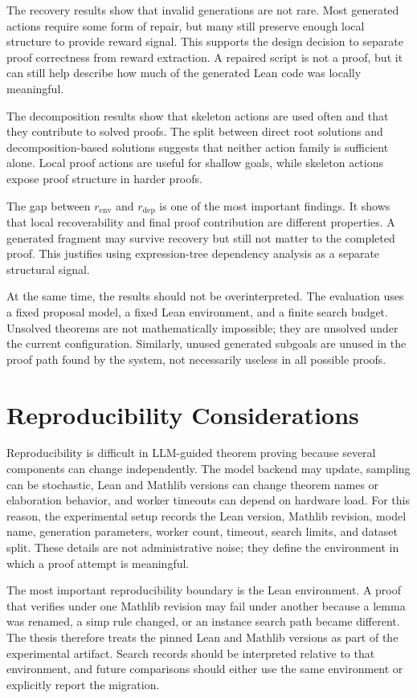\documentclass[en]{uet_awesome_thesis/uet-awesome-thesis}
\begin{document}
The recovery results show that invalid generations are not rare. Most generated actions require some form of repair, but many still preserve enough local structure to provide reward signal. This supports the design decision to separate proof correctness from reward extraction. A repaired script is not a proof, but it can still help describe how much of the generated Lean code was locally meaningful.

The decomposition results show that skeleton actions are used often and that they contribute to solved proofs. The split between direct root solutions and decomposition-based solutions suggests that neither action family is sufficient alone. Local proof actions are useful for shallow goals, while skeleton actions expose proof structure in harder proofs.

The gap between \(r_{\mathrm{env}}\) and \(r_{\mathrm{dep}}\) is one of the most important findings. It shows that local recoverability and final proof contribution are different properties. A generated fragment may survive recovery but still not matter to the completed proof. This justifies using expression-tree dependency analysis as a separate structural signal.

At the same time, the results should not be overinterpreted. The evaluation uses a fixed proposal model, a fixed Lean environment, and a finite search budget. Unsolved theorems are not mathematically impossible; they are unsolved under the current configuration. Similarly, unused generated subgoals are unused in the proof path found by the system, not necessarily useless in all possible proofs.


\section{Reproducibility Considerations}

Reproducibility is difficult in LLM-guided theorem proving because several components can change
independently. The model backend may update, sampling can be stochastic, Lean and Mathlib versions
can change theorem names or elaboration behavior, and worker timeouts can depend on hardware load.
For this reason, the experimental setup records the Lean version, Mathlib revision, model name, generation
parameters, worker count, timeout, search limits, and dataset split. These details are not administrative
noise; they define the environment in which a proof attempt is meaningful.

The most important reproducibility boundary is the Lean environment. A proof that verifies under one
Mathlib revision may fail under another because a lemma was renamed, a simp rule changed, or an
instance search path became different. The thesis therefore treats the pinned Lean and Mathlib versions
as part of the experimental artifact. Search records should be interpreted relative to that environment,
and future comparisons should either use the same environment or explicitly report the migration.
\end{document}
